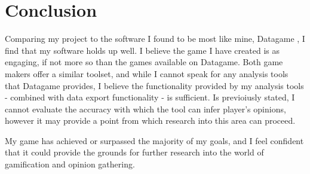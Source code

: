 \chapter{Conclusion}
Comparing my project to the software I found to be most like mine, Datagame \cite{Datagame}, I find that my software holds up well. I believe the game I have created is as engaging, if not more so than the games available on Datagame. Both game makers offer a similar toolset, and while I cannot speak for any analysis tools that Datagame provides, I believe the functionality provided by my analysis tools - combined with data export functionality - is sufficient. Is previoiusly stated, I cannot evaluate the accuracy with which the tool can infer player's opinions, however it may provide a point from which research into this area can proceed.

My game has achieved or surpassed the majority of my goals, and I feel confident that it could provide the grounds for further research into the world of gamification and opinion gathering.
